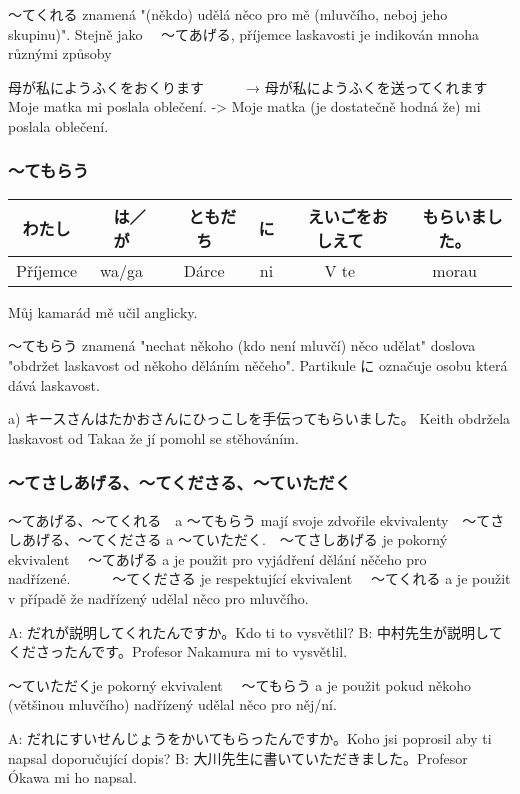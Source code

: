 〜てくれる znamená "(někdo) udělá něco pro mě (mluvčího, neboj jeho skupinu)". Stejně jako 　〜てあげる, příjemce laskavosti je indikován mnoha různými způsoby

母が私にようふくをおくります　　　→   母が私にようふくを送ってくれます
Moje matka mi poslala oblečení.    -> 	Moje matka (je dostatečně hodná že) mi poslala oblečení.




\subsubsection{〜てもらう}
\begin{center}
\begin{tabular}{||c|c||c|c||c|c||}
\hline
わたし&　は／が&　ともだち　&に&　えいごをおしえて&　もらいました。\\
\hline
Příjemce&wa/ga&Dárce&ni&V te&morau\\
\hline
\end{tabular}
\end{center}
Můj kamarád mě učil anglicky.


〜てもらう znamená "nechat někoho (kdo není mluvčí) něco udělat" doslova "obdržet laskavost od někoho děláním něčeho". Partikule に označuje osobu která dává laskavost.

a) キースさんはたかおさんにひっこしを手伝ってもらいました。 Keith obdržela laskavost od Takaa že jí pomohl se stěhováním.



\subsubsection{〜てさしあげる、〜てくださる、〜ていただく}

〜てあげる、〜てくれる　a     〜てもらう mají svoje zdvořile ekvivalenty　〜てさしあげる、〜てくださる a 〜ていただく.　〜てさしあげる je pokorný ekvivalent 　〜てあげる a je použit pro vyjádření dělání něčeho pro nadřízené.　　　〜てくださる je respektující ekvivalent 　〜てくれる a je použit v případě že nadřízený udělal něco pro mluvčího.

A: だれが説明してくれたんですか。Kdo ti to vysvětlil?
B: 中村先生が説明してくださったんです。Profesor Nakamura mi to vysvětlil.

〜ていただくje pokorný ekvivalent 　〜てもらう a je použit pokud někoho (většinou mluvčího) nadřízený udělal něco pro něj/ní.

A: だれにすいせんじょうをかいてもらったんですか。Koho jsi poprosil aby ti napsal doporučující dopis?
B: 大川先生に書いていただきました。Profesor Ókawa mi ho napsal.

